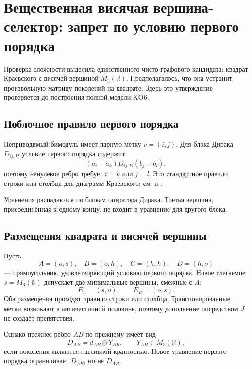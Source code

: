\chapter{Вещественная висячая вершина-селектор: запрет по условию первого порядка}

Проверка сложности выделила единственного чисто графового кандидата:
квадрат Краевского с висячей вершиной \(M_3(\mathbb R)\). Предполагалось,
что она устранит произвольную матрицу поколений на квадрате. Здесь это
утверждение проверяется до построения полной модели KO6.

\section{Поблочное правило первого порядка}

Неприводимый бимодуль имеет парную метку \(v=(i,j)\). Для блока Дирака
\(D_{ij,kl}\) условие первого порядка содержит
\begin{equation}
 (a_i-a_k)D_{ij,kl}(b_j-b_l),
\end{equation}
поэтому ненулевое ребро требует \(i=k\) или \(j=l\). Это стандартное
правило строки или столбца для диаграмм Краевского; см.
 и .

Уравнения распадаются по блокам оператора Дирака. Третья вершина,
присоединённая к одному концу, не входит в уравнение для другого блока.

\section{Размещения квадрата и висячей вершины}

Пусть
\begin{equation}
 A=(o,o),\quad B=(o,h),\quad C=(h,h),\quad D=(h,o)
\end{equation}
--- прямоугольник, удовлетворяющий условию первого порядка. Новое слагаемое
\(s=M_3(\mathbb R)\) допускает две минимальные вершины, смежные с \(A\):
\begin{equation}
 E_L=(s,o),\qquad E_R=(o,s).
\end{equation}
Оба размещения проходят правило строки или столбца. Транспонированные метки
возникают в античастичной половине, поэтому дополнение посредством \(J\) не
создаёт препятствия.

Однако прежнее ребро \(AB\) по-прежнему имеет вид
\begin{equation}
 D_{AB}=d_{AB}\otimes Y_{AB},
 \qquad Y_{AB}\in M_3(\mathbb R),
\end{equation}
если поколения являются пассивной кратностью. Новое уравнение первого
порядка ограничивает \(D_{AE}\), но не \(D_{AB}\).

